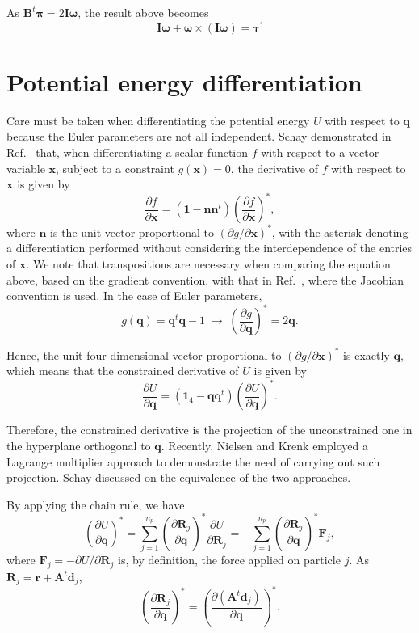 \documentclass[aip,jcp,reprint,amsmath,amssymb,raggedbottom]{revtex4-1}
\newcommand{\mt}[1]{\boldsymbol{\mathbf{#1}}}           %
\newcommand{\vt}[1]{\boldsymbol{\mathbf{#1}}}           %
\newcommand{\tr}[1]{#1^t}                               %
\newcommand{\diff}[2]{\dfrac{\partial #1}{\partial #2}} %
\begin{document}
As $\tr{\mt B}\vt \pi = 2 \mt I \vt \omega$, the result above becomes
\[
\mt I \dot{\vt \omega} + \vt \omega \times (\mt I \vt \omega) = {\vt \tau}^\prime
\]

\section{Potential energy differentiation}
\label{sec:Diff_PotEng}

Care must be taken when differentiating the potential energy $U$ with respect to $\vt q$ because the Euler parameters are not all independent. Schay demonstrated in Ref.~\cite{Schay1995} that, when differentiating a scalar function $f$ with respect to a vector variable $\vt x$, subject to a constraint $g(\vt x) = 0$, the derivative of $f$ with respect to $\vt x$ is given by
\[
\diff{f}{\vt x} = (\vt 1 - \vt n \tr{\vt n})\left( \diff{f}{\vt x} \right)^\ast,
\]
where $\vt n$ is the unit vector proportional to $(\partial g/\partial \vt x)^\ast$, with the asterisk denoting a differentiation performed without considering the interdependence of the entries of $\vt x$. We note that transpositions are necessary when comparing the equation above, based on the gradient convention, with that in Ref.~\cite{Schay1995}, where the Jacobian convention is used. In the  case of Euler parameters,
\[
g(\vt q) = \tr{\vt q}\vt q - 1 \; \rightarrow \; \left(\diff{g}{\vt q}\right)^\ast = 2 \vt q.
\]

Hence, the unit four-dimensional vector proportional to $(\partial g/\partial \vt x)^\ast$ is exactly $\vt q$, which means that the constrained derivative of $U$ is given by
\begin{equation}
\label{eq:diff_projection}
\diff{U}{\vt q} = (\mt 1_4 - {\vt q}\tr{\vt q})\left( \diff{U}{\vt q} \right)^\ast.
\end{equation}

Therefore, the constrained derivative is the projection of the unconstrained one in the hyperplane orthogonal to $\vt q$. Recently, Nielsen and Krenk\cite{Nielsen2012} employed a Lagrange multiplier approach to demonstrate the need of carrying out such projection. Schay\cite{Schay1995, Schay1998} discussed on the equivalence of the two approaches.

By applying the chain rule, we have
\[
\left( \diff{U}{\vt q} \right)^\ast = \sum_{j=1}^{n_p} \left( \diff{\vt R_j}{\vt q} \right)^\ast \diff{U}{\vt R_j} = - \sum_{j=1}^{n_p} \left( \diff{\vt R_j}{\vt q} \right)^\ast {\vt F_j},
\]
where $\vt F_j = -\partial U/\partial \vt R_j$ is, by definition, the force applied on particle $j$. As $\vt R_j = \vt r + \tr{\mt A}\vt d_j$,
\[
\left( \diff{\vt R_j}{\vt q} \right)^\ast = \left( \diff{(\tr{\mt A}\vt d_j)}{\vt q} \right)^\ast.
\]
\end{document}
